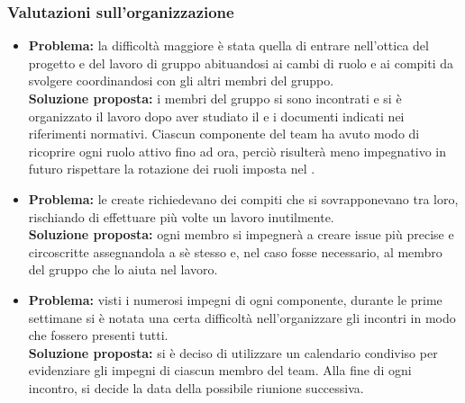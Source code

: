 \subsubsection{Valutazioni sull'organizzazione}
\begin{itemize}
	\item \textbf{Problema:} la difficoltà maggiore è stata quella di entrare nell'ottica del progetto e del lavoro di gruppo abituandosi ai cambi di ruolo e ai compiti da svolgere coordinandosi con gli altri membri del gruppo.\\
	\textbf{Soluzione proposta:} i membri del gruppo si sono incontrati e si è organizzato il lavoro dopo aver studiato il  e i documenti indicati nei riferimenti normativi. Ciascun componente del team ha avuto modo di ricoprire ogni ruolo attivo fino ad ora, perciò risulterà meno impegnativo in futuro rispettare la rotazione dei ruoli imposta nel .
	\item \textbf{Problema:} le  create richiedevano dei compiti che si sovrapponevano tra loro, rischiando di effettuare più volte un lavoro inutilmente.\\
	\textbf{Soluzione proposta:} ogni membro si impegnerà a creare issue più precise e circoscritte assegnandola a sè stesso e, nel caso fosse necessario, al membro del gruppo che lo aiuta nel lavoro.
	\item \textbf{Problema:} visti i numerosi impegni di ogni componente, durante le prime settimane si è notata una certa difficoltà nell'organizzare gli incontri in modo che fossero presenti tutti.\\
	\textbf{Soluzione proposta:} si è deciso di utilizzare un calendario condiviso per evidenziare gli impegni di ciascun membro del team. Alla fine di ogni incontro, si decide la data della possibile riunione successiva.
\end{itemize}
